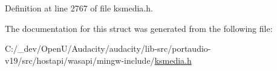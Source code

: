 Definition at line 2767 of file ksmedia.\+h.



The documentation for this struct was generated from the following file\+:\begin{DoxyCompactItemize}
\item 
C\+:/\+\_\+dev/\+Open\+U/\+Audacity/audacity/lib-\/src/portaudio-\/v19/src/hostapi/wasapi/mingw-\/include/\hyperlink{ksmedia_8h}{ksmedia.\+h}\end{DoxyCompactItemize}
